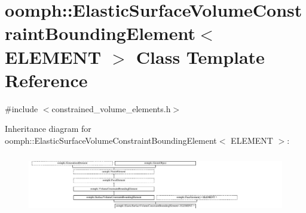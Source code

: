 \hypertarget{classoomph_1_1ElasticSurfaceVolumeConstraintBoundingElement}{}\section{oomph\+:\+:Elastic\+Surface\+Volume\+Constraint\+Bounding\+Element$<$ E\+L\+E\+M\+E\+NT $>$ Class Template Reference}
\label{classoomph_1_1ElasticSurfaceVolumeConstraintBoundingElement}


{\ttfamily \#include $<$constrained\+\_\+volume\+\_\+elements.\+h$>$}

Inheritance diagram for oomph\+:\+:Elastic\+Surface\+Volume\+Constraint\+Bounding\+Element$<$ E\+L\+E\+M\+E\+NT $>$\+:\begin{figure}[H]
\begin{center}
\leavevmode
\includegraphics[height=2.647754cm]{classoomph_1_1ElasticSurfaceVolumeConstraintBoundingElement}
\end{center}
\end{figure}
